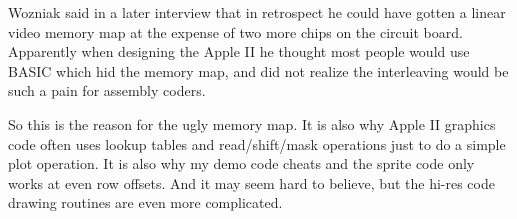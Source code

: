 \documentclass{article}
\begin{document}
%
%
%

Wozniak said in a later interview that in retrospect he could have
gotten a linear video memory map at the expense of two more chips
on the circuit board.
Apparently when designing the Apple II he thought most people would use BASIC
which hid the memory map, and did not realize the interleaving would
be such a pain for assembly coders.

So this is the reason for the ugly memory map.
It is also why Apple II graphics code often uses lookup tables and
read/shift/mask operations just to do a simple plot operation.
It is also why my demo code cheats and the sprite code only works
at even row offsets.
And it may seem hard to believe, but the hi-res code drawing routines
are even more complicated.


\end{document}
